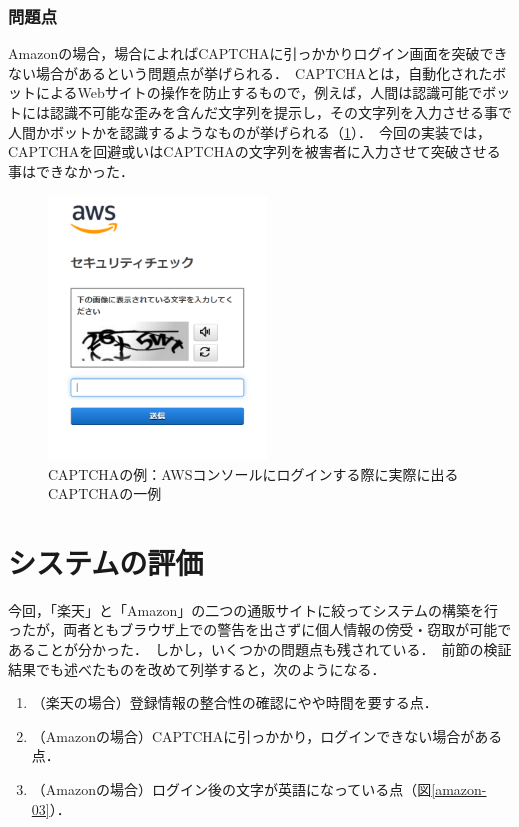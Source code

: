 \documentclass[dvipdfmx]{jsarticle}
\begin{document}
                \subsubsection{問題点}
                    Amazonの場合，場合によればCAPTCHAに引っかかりログイン画面を突破できない場合があるという問題点が挙げられる．\
                    CAPTCHAとは，自動化されたボットによるWebサイトの操作を防止するもので，例えば，人間は認識可能でボットには認識不可能な歪みを含んだ文字列を提示し，その文字列を入力させる事で人間かボットかを認識するようなものが挙げられる（\ref{captcha}）．\
                    今回の実装では，CAPTCHAを回避或いはCAPTCHAの文字列を被害者に入力させて突破させる事はできなかった．\
                    \begin{figure}[pth]
                        \centering
                        \includegraphics[height=7cm]{img/captcha.png}
                        \caption{CAPTCHAの例：AWSコンソールにログインする際に実際に出るCAPTCHAの一例}
                        \label{captcha}
                    \end{figure}
                    \clearpage
        \section{システムの評価}
            今回，「楽天」と「Amazon」の二つの通販サイトに絞ってシステムの構築を行ったが，両者ともブラウザ上での警告を出さずに個人情報の傍受・窃取が可能であることが分かった．\
            しかし，いくつかの問題点も残されている．\
            前節の検証結果でも述べたものを改めて列挙すると，次のようになる．\
            \begin{enumerate}
                \item （楽天の場合）登録情報の整合性の確認にやや時間を要する点．
                \item （Amazonの場合）CAPTCHAに引っかかり，ログインできない場合がある点．
                \item （Amazonの場合）ログイン後の文字が英語になっている点（図\ref{amazon-03}）．
            \end{enumerate}
\end{document}
